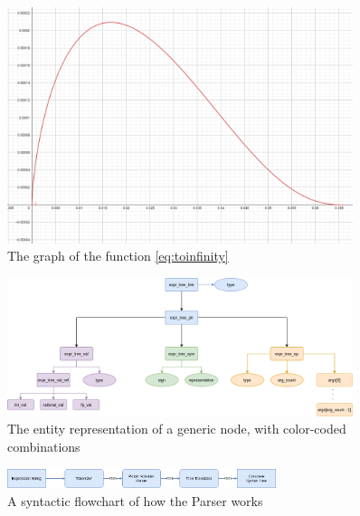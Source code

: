 \documentclass{article}
\theoremstyle{plain}
\theoremstyle{definition}
\begin{document}
	\newpage
	\appendix
	\begin{figure}
		\centering
		\includegraphics[width=0.9\textwidth]{img/limoff1.PNG}
		\caption{The graph of the function \eqref{eq:toinfinity}}\label{fig:limoff1}
	\end{figure}

	\begin{figure}
		\centering
		\includegraphics[width=0.9\textwidth]{chart/expr_structs.PNG}
		\caption{The entity representation of a generic node, with color-coded combinations} \label{fig:expr_structs}
	\end{figure}

	\begin{figure}
		\centering
		\includegraphics[width=0.7\textwidth]{chart/parser.PNG}
		\caption{A syntactic flowchart of how the Parser works} \label{fig:parser}
	\end{figure}

	
	
\end{document}
